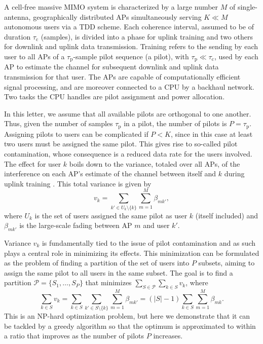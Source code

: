 \documentclass[]{IEEEtran}
\begin{document}
A cell-free massive MIMO system \cite{naylm17} is characterized by a large
number $M$ of single-antenna, geographically distributed APs simultaneously
serving $K\ll M$ autonomous users via a TDD scheme. Each coherence interval,
assumed to be of duration $\tau_\mathrm{c}$ (samples), is divided into a phase
for uplink training and two others for downlink and uplink data transmission.
Training refers to the sending by each user to all APs of a
$\tau_\mathrm{p}$-sample pilot sequence (a pilot), with
$\tau_\mathrm{p}\ll\tau_\mathrm{c}$, used by each AP to estimate the channel for
subsequent downlink and uplink data transmission for that user. The APs are
capable of computationally efficient signal processing, and are moreover
connected to a CPU by a backhaul network. Two tasks the CPU handles are pilot
assignment and power allocation.

In this letter, we assume that all available pilots are orthogonal to one
another. Thus, given the number of samples $\tau_\mathrm{p}$ in a pilot,
the number of pilots is $P=\tau_\mathrm{p}$. Assigning pilots to users can be
complicated if $P<K$, since in this case at least two users must be assigned the
same pilot. This gives rise to so-called pilot contamination, whose consequence
is a reduced data rate for the users involved. The effect for user $k$ boils
down to the variance, totaled over all APs, of the interference on each AP's
estimate of the channel between itself and $k$ during uplink training
\cite{naylm17}. This total variance is given by
\begin{equation}
v_k=\sum_{k'\in U_k\setminus\{k\}}\sum_{m=1}^M\beta_{mk'},
\end{equation}
where $U_k$ is the set of users assigned the same pilot as user $k$ (itself
included) and $\beta_{mk'}$ is the large-scale fading between AP $m$ and user
$k'$.

Variance $v_k$ is fundamentally tied to the issue of pilot contamination and as
such plays a central role in minimizing its effects. This minimization can be
formulated as the problem of finding a partition of the set of users into
$P$ subsets, aiming to assign the same pilot to all users in the same subset.
The goal is to find a partition $\mathcal{P}=\{S_1,\ldots,S_P\}$ that minimizes
$\sum_{S\in\mathcal{P}}\sum_{k\in S}v_k$, where
\begin{equation}
\sum_{k\in S}v_k=
\sum_{k\in S}\sum_{k'\in S\setminus\{k\}}\sum_{m=1}^M\beta_{mk'}=
(\vert S\vert-1)\sum_{k\in S}\sum_{m=1}^M\beta_{mk}.
\label{sumSvk}
\end{equation}
This is an NP-hard optimization problem, but here we demonstrate that it can be
tackled by a greedy algorithm so that the optimum is approximated to within a
ratio that improves as the number of pilots $P$ increases.
\end{document}
